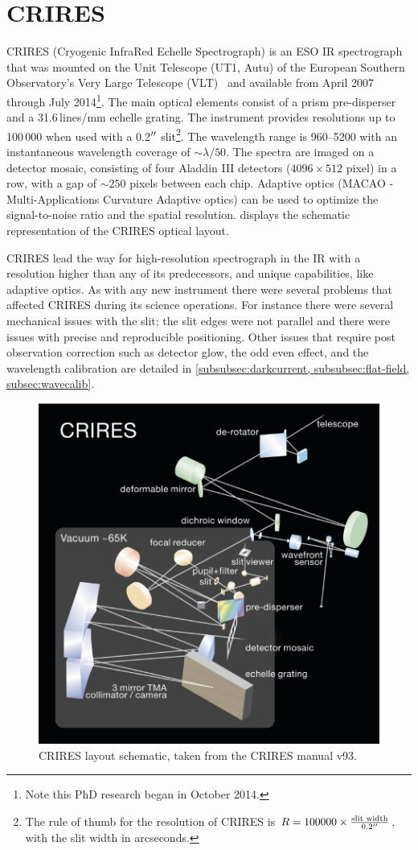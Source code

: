 \section{CRIRES}
\label{sec:CRIRES}
CRIRES (Cryogenic InfraRed Echelle Spectrograph) is an ESO {IR} spectrograph that was mounted on the Unit Telescope (UT1, Autu) of the European Southern Observatory's Very Large Telescope (VLT)~\citep{kaeufl_crires_2004} and available from April 2007 through July 2014\footnote{Note this PhD research began in October 2014.}.
The main optical elements consist of a prism pre-disperser and a 31.6\,lines/mm echelle grating.
The instrument provides resolutions up to 100\,000 when used with a 0.2$^{\prime\prime}$ slit\footnote{The rule of thumb for the resolution of CRIRES is \(R = 100000 \times \frac{\textrm{slit width}}{0.2^{\prime\prime}}\), with the slit width in arcseconds.}.
The wavelength range is 960--5200\nm{} with an instantaneous wavelength coverage of \(\sim \lambda/50\).
The spectra are imaged on a detector mosaic, consisting of four Aladdin III detectors (\(4096 \times 512\) pixel) in a row, with a gap of \(\sim 250\) pixels between each chip.
Adaptive optics (MACAO - Multi-Applications Curvature Adaptive optics) can be used to optimize the signal-to-noise ratio and the spatial resolution.
 displays the schematic representation of the CRIRES optical layout.

CRIRES lead the way for high-resolution spectrograph in the {IR} with a resolution higher than any of its predecessors, and unique capabilities, like adaptive optics.
As with any new instrument there were several problems that affected CRIRES during its science operations.
For instance there were several mechanical issues with the slit; the slit edges were not parallel and there were issues with precise and reproducible positioning.
Other issues that require post observation correction such as detector glow, the odd even effect, and the wavelength calibration are detailed in \cref{subsubsec:darkcurrent, subsubsec:flat-field, subsec:wavecalib}.

\begin{figure}
    \centering
    \includegraphics[width=0.7\linewidth]{figures/spectroscopy/CRIRES_schematic.pdf}
    \caption{CRIRES layout schematic, taken from the CRIRES manual v93.}
    \label{fig:criresschematic}
\end{figure}


